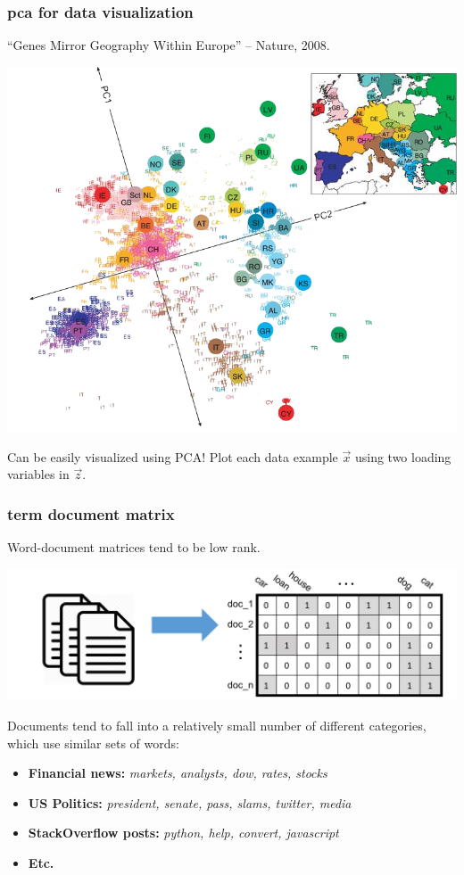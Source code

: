 \documentclass[handout,compress]{beamer}
\begin{document}
\begin{frame}
	\frametitle{pca for data visualization}
	``Genes Mirror Geography Within Europe'' -- Nature, 2008.
	\begin{center}
		\includegraphics[width=.65\textwidth]{genes_pca.png}
	\end{center}
	Can be easily visualized using PCA! Plot each data example $\vec{x}$ using two loading variables in $\vec{z}$.
\end{frame}

\begin{frame}
	\frametitle{term document matrix}
	Word-document matrices tend to be low rank. 
	\begin{center}
		\includegraphics[width=.7\textwidth]{term_doc.png}
	\end{center}
	Documents tend to fall into a relatively small number of different categories, which use similar sets of words:
	\begin{itemize}
		\item \textbf{Financial news:} \textit{markets, analysts, dow, rates, stocks} 
		\item \textbf{US Politics:} \textit{president, senate, pass, slams, twitter, media} 
		\item \textbf{StackOverflow posts:} \textit{python, help, convert, javascript} 
		\item\textbf{Etc.}
	\end{itemize}
\end{frame}
\end{document}
